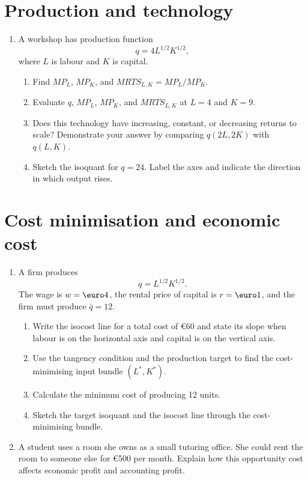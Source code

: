 \documentclass[11pt,a4paper]{article}
\begin{document}
\section{Production and technology}

\begin{enumerate}[label=\textbf{3.\alph*}]
  \item A workshop has production function
  \[
    q=4L^{1/2}K^{1/2},
  \]
  where \(L\) is labour and \(K\) is capital.
  \begin{enumerate}[label=(\roman*)]
    \item Find \(MP_L\), \(MP_K\), and
    \(MRTS_{L,K}=MP_L/MP_K\).
    \item Evaluate \(q\), \(MP_L\), \(MP_K\), and \(MRTS_{L,K}\) at
    \(L=4\) and \(K=9\).
    \item Does this technology have increasing, constant, or decreasing
    returns to scale? Demonstrate your answer by comparing
    \(q(2L,2K)\) with \(q(L,K)\).
    \item Sketch the isoquant for \(q=24\). Label the axes and indicate the
    direction in which output rises.
  \end{enumerate}
\end{enumerate}

\section{Cost minimisation and economic cost}

\begin{enumerate}[label=\textbf{4.\alph*}]
  \item A firm produces
  \[
    q=L^{1/2}K^{1/2}.
  \]
  The wage is \(w=\text{\euro}4\), the rental price of capital is \(r=\text{\euro}1\), and
  the firm must produce \(\bar q=12\).
  \begin{enumerate}[label=(\roman*)]
    \item Write the isocost line for a total cost of \euro60 and state its
    slope when labour is on the horizontal axis and capital is on the
    vertical axis.
    \item Use the tangency condition and the production target to find the
    cost-minimising input bundle \((L^*,K^*)\).
    \item Calculate the minimum cost of producing 12 units.
    \item Sketch the target isoquant and the isocost line through the
    cost-minimising bundle.
  \end{enumerate}

  \item A student uses a room she owns as a small tutoring office. She could
  rent the room to someone else for \euro500 per month. Explain how this
  opportunity cost affects economic profit and accounting profit.
\end{enumerate}
\end{document}
